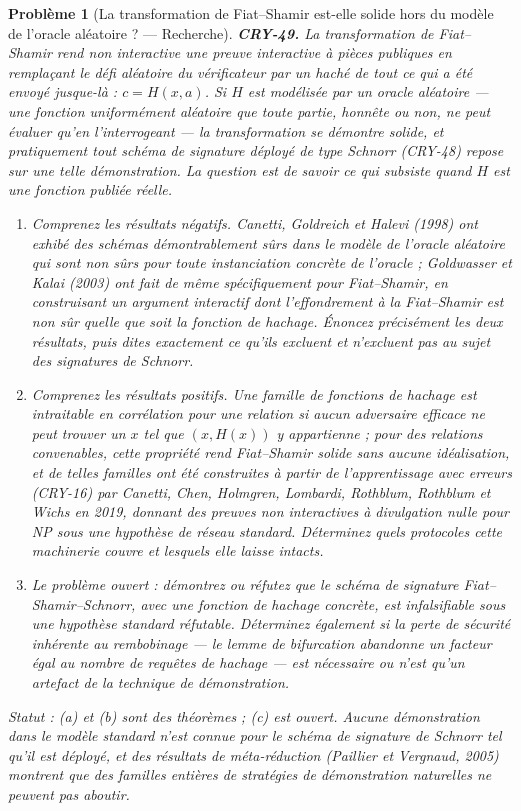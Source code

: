 \documentclass[11pt]{article}
\newtheorem{problem}{Problème}
\begin{document}
\bigskip

\begin{problem}[{La transformation de Fiat--Shamir est-elle solide hors du modèle de l'oracle aléatoire ? --- Recherche}]
\textbf{CRY-49.} La transformation de Fiat--Shamir rend non interactive une preuve
interactive à pièces publiques en remplaçant le défi aléatoire du vérificateur par un haché de
tout ce qui a été envoyé jusque-là : $c = H(x, a)$. Si $H$ est modélisée par un \textit{oracle
aléatoire} --- une fonction uniformément aléatoire que toute partie, honnête ou non, ne peut
évaluer qu'en l'interrogeant --- la transformation se démontre solide, et pratiquement tout
schéma de signature déployé de type Schnorr (CRY-48) repose sur une telle démonstration. La
question est de savoir ce qui subsiste quand $H$ est une fonction publiée réelle.
\begin{enumerate}
\item[(a)] Comprenez les résultats négatifs. Canetti, Goldreich et Halevi (1998) ont exhibé des
schémas démontrablement sûrs dans le modèle de l'oracle aléatoire qui sont non sûrs pour
\textit{toute} instanciation concrète de l'oracle ; Goldwasser et Kalai (2003) ont fait de même
spécifiquement pour Fiat--Shamir, en construisant un argument interactif dont l'effondrement à
la Fiat--Shamir est non sûr quelle que soit la fonction de hachage. Énoncez précisément les
deux résultats, puis dites exactement ce qu'ils excluent et n'excluent pas au sujet des
signatures de Schnorr.
\item[(b)] Comprenez les résultats positifs. Une famille de fonctions de hachage est \textit{intraitable
en corrélation} pour une relation si aucun adversaire efficace ne peut trouver un $x$ tel
que $(x, H(x))$ y appartienne ; pour des relations convenables, cette propriété rend
Fiat--Shamir solide sans aucune idéalisation, et de telles familles ont été construites à
partir de l'apprentissage avec erreurs (CRY-16) par Canetti, Chen, Holmgren, Lombardi,
Rothblum, Rothblum et Wichs en 2019, donnant des preuves non interactives à divulgation nulle
pour NP sous une hypothèse de réseau standard. Déterminez quels protocoles cette machinerie
couvre et lesquels elle laisse intacts.
\item[(c)] Le problème ouvert : démontrez ou réfutez que le schéma de signature Fiat--Shamir--Schnorr,
avec une fonction de hachage concrète, est infalsifiable sous une hypothèse standard
réfutable. Déterminez également si la perte de sécurité inhérente au rembobinage --- le lemme de
bifurcation abandonne un facteur égal au nombre de requêtes de hachage --- est nécessaire ou
n'est qu'un artefact de la technique de démonstration.
\end{enumerate}
\textit{Statut : (a) et (b) sont des théorèmes ; (c) est ouvert. Aucune démonstration dans le
modèle standard n'est connue pour le schéma de signature de Schnorr tel qu'il est déployé, et
des résultats de méta-réduction (Paillier et Vergnaud, 2005) montrent que des familles
entières de stratégies de démonstration naturelles ne peuvent pas aboutir.}
\end{problem}
\end{document}
